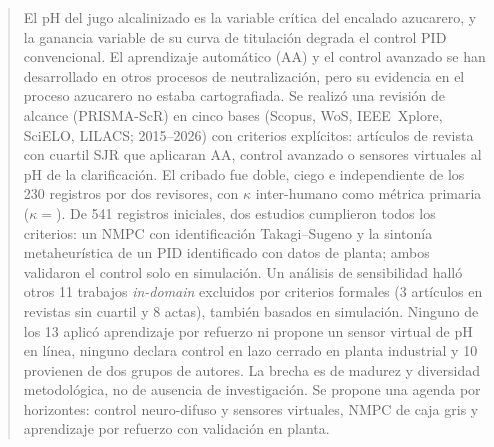 \clearpage

\begin{abstract}

\noindent
El pH del jugo alcalinizado es la variable crítica del encalado azucarero,
y la ganancia variable de su curva de titulación degrada el control PID
convencional. El aprendizaje automático (AA) y el control avanzado se han
desarrollado en otros procesos de neutralización, pero su evidencia en el
proceso azucarero no estaba cartografiada. Se realizó una revisión de
alcance (PRISMA-ScR) en cinco bases (Scopus, WoS, IEEE~Xplore, SciELO,
LILACS; 2015--2026) con criterios explícitos:
artículos de revista con cuartil SJR que aplicaran AA, control avanzado o
sensores virtuales al pH de la clarificación. El cribado fue doble,
ciego e independiente de los 230 registros por dos revisores, con
$\kappa$ inter-humano como métrica primaria ($\kappa=$\KappaInter). De 541 registros iniciales, dos estudios cumplieron
todos los criterios: un NMPC con identificación Takagi--Sugeno y la
sintonía metaheurística de un PID identificado con datos de planta;
ambos validaron el control solo en simulación. Un análisis de
sensibilidad halló otros 11 trabajos \textit{in-domain} excluidos por
criterios formales (3 artículos en revistas sin cuartil y 8 actas),
también basados en simulación. Ninguno de los 13 aplicó aprendizaje por
refuerzo ni propone un sensor virtual de pH en línea, ninguno declara
control en lazo cerrado en planta industrial y 10 provienen de dos
grupos de autores. La brecha es de madurez y diversidad metodológica,
no de ausencia de investigación. Se propone una agenda por horizontes:
control neuro-difuso y sensores virtuales, NMPC de caja gris y
aprendizaje por refuerzo con validación en planta.

\medskip
{}

\end{abstract}
\clearpage

